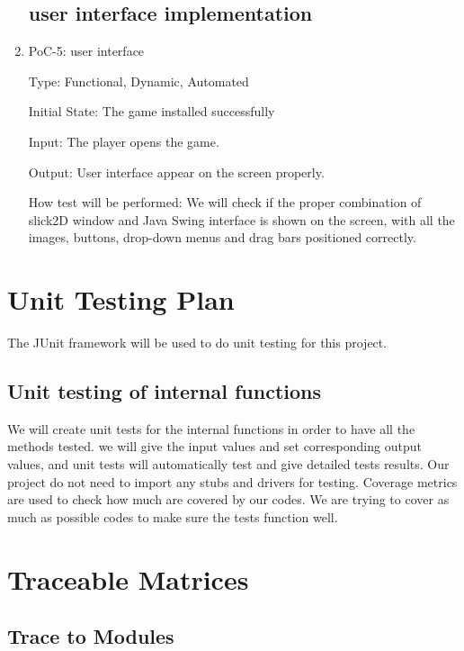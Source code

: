 \documentclass[12pt]{article}
\begin{document}
\begin{enumerate}
\subsection{user interface implementation}

      \item{PoC-5: user interface}
      
      Type: Functional, Dynamic, Automated
      
      Initial State: The game installed successfully
      
      Input: The player opens the game.
      
      Output: User interface appear on the screen properly.
      
      How test will be performed: We will check if the proper combination of slick2D window and Java Swing interface is shown on the screen, with all the images, buttons, drop-down menus and drag bars positioned correctly.
      

	\end{enumerate}
	
							
				
\section{Unit Testing Plan}
	The JUnit framework will be used to do unit testing for this project. 
		
	\subsection{Unit testing of internal functions}
	We will create unit tests for the internal functions in order to have all the methods tested. we will give the input values and set corresponding output values, and unit tests will automatically test and give detailed tests results. Our project do not need to import any stubs and drivers for testing. Coverage metrics are used to check how much are covered by our codes. We are trying to cover as much as possible codes to make sure the tests function well.
		
\color{red}
\section{Traceable Matrices}

\subsection{Trace to Modules}
\end{document}
